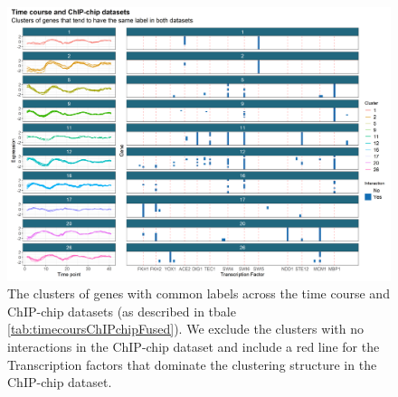 \documentclass[]{article}
\begin{document}
%
\begin{figure}
	\centering
	\includegraphics[scale=0.6]{./Images/Yeast/timecourseChIPchipFused.png}
	\caption{The clusters of genes with common labels across the time course  and ChIP-chip datasets (as described in tbale \ref{tab:timecoursChIPchipFused}). We exclude the clusters with no interactions in the ChIP-chip dataset and include a red line for the Transcription factors that dominate the clustering structure in the ChIP-chip dataset.}
	\label{fig:timepointChIPchipFused}
\end{figure}
\end{document}
